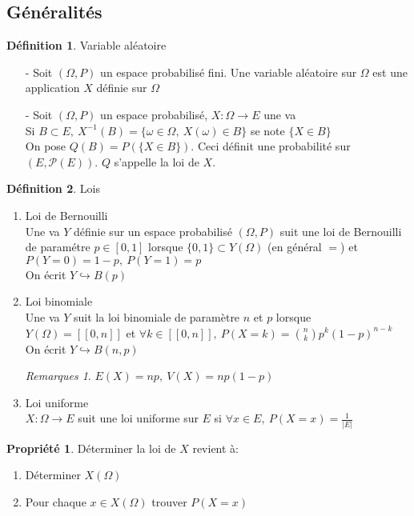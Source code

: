 \documentclass[fleqn]{article}
\theoremstyle{definition} \newtheorem*{defi}{D\'efinition}
\theoremstyle{definition} \newtheorem*{theo}{Th\'eor\`eme}
\theoremstyle{definition} \newtheorem*{coro}{Corollaire}
\theoremstyle{remark} \newtheorem*{rqs}{Remarques}
\theoremstyle{definition} \newtheorem*{prop}{Propri\'et\'e}
\begin{document}
\subsection{G\'en\'eralit\'es}
\begin{defi} Variable al\'eatoire
	\begin{itemize}
		\item [-] Soit $(\Omega, P)$ un espace probabilis\'e fini. Une variable al\'eatoire sur $\Omega$ est une application $X$ d\'efinie sur
			$\Omega$
		\item [-] Soit $(\Omega, P)$ un espace probabilis\'e, $X: \Omega \rightarrow E$ une va\\
			Si $B \subset E,\ X^{-1}(B) = \{\omega \in \Omega ,\ X(\omega) \in B\}$ se note $\{X \in B\}$\\
			On pose $Q(B) = P(\{X \in B\})$. Ceci d\'efinit une probabilit\'e sur $(E, \mathcal{P}(E))$. $Q$ s'appelle la loi de $X$.
	\end{itemize}
\end{defi}

\begin{defi} Lois
	\begin{enumerate}
		\item Loi de Bernouilli\\
			Une va $Y$ d\'efinie sur un espace probabilis\'e $(\Omega, P)$ suit une loi de Bernouilli de param\'etre $p \in [0,1]$ lorsque
			$\{0,1\} \subset Y(\Omega)$ (en g\'en\'eral $=$) et $P(Y = 0) = 1-p,\ P(Y = 1) = p$ \\
			On \'ecrit $Y \hookrightarrow B(p)$
		\item Loi binomiale \\
			Une va $Y$ suit la loi binomiale de param\`etre $n$ et $p$ lorsque $Y(\Omega) = [\![0,n]\!]$ et $\forall k \in [\![0,n]\!],\
			P(X=k) = \binom{n}{k} p^k (1-p)^{n-k}$\\
			On \'ecrit $Y \hookrightarrow B(n,p)$

			\begin{rqs}
				$E(X) = np,\ V(X) = np(1-p)$
			\end{rqs}
		\item Loi uniforme \\
			$X: \Omega \rightarrow E$ suit une loi uniforme sur $E$ si $\forall x \in E,\ P(X = x) = \frac{1}{|E|}$
	\end{enumerate}
\end{defi}

\begin{prop} D\'eterminer la loi de $X$ revient \`a:
	\begin{enumerate}
		\item D\'eterminer $X(\Omega)$
		\item Pour chaque $x \in X(\Omega)$ trouver $P(X=x)$
	\end{enumerate}
\end{prop}
\end{document}
